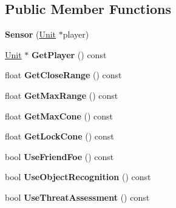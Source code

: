 \subsection*{Public Member Functions}
\begin{DoxyCompactItemize}
\item 
{\bfseries Sensor} (\hyperlink{classUnit}{Unit} $\ast$player)\hypertarget{classRadar_1_1Sensor_a4d38f09ec1ba0f5ba83a6a217b2a35d9}{}\label{classRadar_1_1Sensor_a4d38f09ec1ba0f5ba83a6a217b2a35d9}

\item 
\hyperlink{classUnit}{Unit} $\ast$ {\bfseries Get\+Player} () const \hypertarget{classRadar_1_1Sensor_a158eec533331d32ac8c6848e8d34bfd2}{}\label{classRadar_1_1Sensor_a158eec533331d32ac8c6848e8d34bfd2}

\item 
float {\bfseries Get\+Close\+Range} () const \hypertarget{classRadar_1_1Sensor_a6c023f48823c92b12d6a5d89ed434a0b}{}\label{classRadar_1_1Sensor_a6c023f48823c92b12d6a5d89ed434a0b}

\item 
float {\bfseries Get\+Max\+Range} () const \hypertarget{classRadar_1_1Sensor_a013e1471876f1a83fc6ea42873c5c749}{}\label{classRadar_1_1Sensor_a013e1471876f1a83fc6ea42873c5c749}

\item 
float {\bfseries Get\+Max\+Cone} () const \hypertarget{classRadar_1_1Sensor_a736d59651171b61ec51d80724bdfe7e2}{}\label{classRadar_1_1Sensor_a736d59651171b61ec51d80724bdfe7e2}

\item 
float {\bfseries Get\+Lock\+Cone} () const \hypertarget{classRadar_1_1Sensor_a0c5377d7ceb8998426819f42a7cd9183}{}\label{classRadar_1_1Sensor_a0c5377d7ceb8998426819f42a7cd9183}

\item 
bool {\bfseries Use\+Friend\+Foe} () const \hypertarget{classRadar_1_1Sensor_a6e7845552125c77f1d26708e53d39ce9}{}\label{classRadar_1_1Sensor_a6e7845552125c77f1d26708e53d39ce9}

\item 
bool {\bfseries Use\+Object\+Recognition} () const \hypertarget{classRadar_1_1Sensor_a840a818277c01bd439940a4a38c26617}{}\label{classRadar_1_1Sensor_a840a818277c01bd439940a4a38c26617}

\item 
bool {\bfseries Use\+Threat\+Assessment} () const \hypertarget{classRadar_1_1Sensor_ac0eb412da05f7c3df95b76593b6cea06}{}\label{classRadar_1_1Sensor_ac0eb412da05f7c3df95b76593b6cea06}


\end{DoxyCompactItemize}
